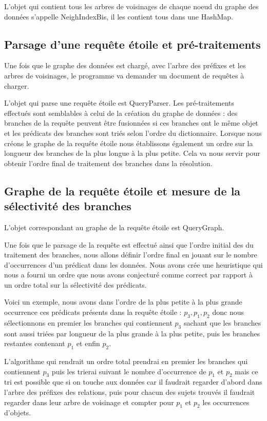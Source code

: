 \documentclass[12pt]{report}
\begin{document}
L'objet qui contient tous les arbres de voisinages de chaque noeud du graphe des données s'appelle NeighIndexBis, il les contient tous dans une HashMap.

\subsection{Parsage d'une requête étoile et pré-traitements}

Une fois que le graphe des données est chargé, avec l'arbre des préfixes et les arbres de voisinages, le programme va demander un document de requêtes à charger.

L'objet qui parse une requête étoile est QueryParser. Les pré-traitements effectués sont semblables à celui de la création du graphe de données : des branches de la requête peuvent être fusionnées si ces branches ont le même objet et les prédicats des branches sont triés selon l'ordre du dictionnaire. Lorsque nous créons le graphe de la requête étoile nous établissons également  un ordre sur la longueur des branches de la plus longue à la plus petite. Cela va nous servir pour obtenir l'ordre final de traitement des branches dans la résolution.

\subsection{Graphe de la requête étoile et mesure de la sélectivité des branches}

L'objet correspondant au graphe de la requête étoile est QueryGraph.

Une fois que le parsage de la requête est effectué ainsi que l'ordre initial des du traitement des branches, nous allons définir l'ordre final en jouant sur le nombre d'occurrences d'un prédicat dans les données. Nous avons crée une heuristique qui nous a fourni un ordre que nous avons conjecturé comme correct par rapport à un ordre total sur la sélectivité des prédicats. 

Voici un exemple, nous avons dans l'ordre de la plus petite à la plus grande occurrence ces prédicats présents dans la requête étoile : $p_{3},p_{1},p_{2}$ donc nous sélectionnons en premier les branches qui contiennent $p_{3}$ sachant que les branches sont aussi triées par longueur de la plus grande à la plus petite, puis les branches restantes contenant $p_{1}$ et enfin $p_{2}$.

L'algorithme qui rendrait un ordre total prendrai en premier les branches qui contiennent $p_{3}$ puis les trierai suivant le nombre d'occurrence de $p_{1}$ et $p_{2}$ mais ce tri est possible que si on touche aux données car il faudrait regarder d'abord dans l'arbre des préfixes des relations, puis pour chacun des sujets trouvés il faudrait regarder dans leur arbre de voisinage et compter pour $p_{1}$ et $p_{2}$ les occurrences d'objets. 
\end{document}
